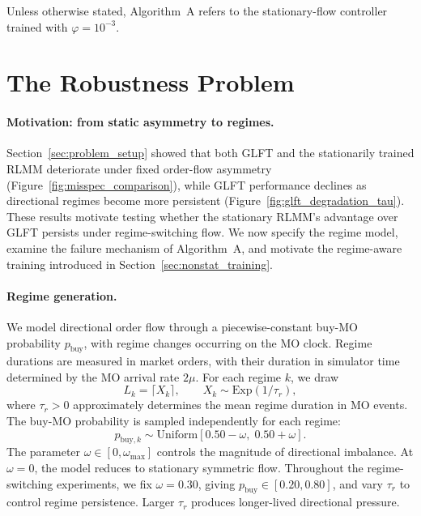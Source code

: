 \documentclass[11pt,a4paper]{article}
\begin{document}
Unless otherwise stated, Algorithm~A refers to the
stationary-flow controller trained with $\varphi=10^{-3}$.

\section{The Robustness Problem}
\label{sec:robustness}


\paragraph{Motivation: from static asymmetry to regimes.}
Section~\ref{sec:problem_setup} showed that both GLFT and the
stationarily trained RLMM deteriorate under fixed order-flow
asymmetry (Figure~\ref{fig:misspec_comparison}), while GLFT
performance declines as directional regimes become more
persistent (Figure~\ref{fig:glft_degradation_tau}).
These results motivate testing whether the stationary RLMM's
advantage over GLFT persists under regime-switching flow.
We now specify the regime model, examine the failure mechanism
of Algorithm~A, and motivate the regime-aware training
introduced in Section~\ref{sec:nonstat_training}.

\paragraph{Regime generation.}
We model directional order flow through a piecewise-constant
buy-MO probability $p_{\mathrm{buy}}$, with regime changes
occurring on the MO clock. Regime durations are measured
in market orders, with their duration in simulator time determined by
the MO arrival rate $2\mu$. For each regime $k$, we draw
\begin{equation}
  L_k=\lceil X_k\rceil,\qquad
  X_k\sim\mathrm{Exp}(1/\tau_r),
\end{equation}
where $\tau_r>0$ approximately determines the mean regime
duration in MO events. The buy-MO probability is sampled
independently for each regime:
\begin{equation}
  p_{\mathrm{buy},k}
  \sim\mathrm{Uniform}[0.50-\omega,\;0.50+\omega].
\end{equation}
The parameter $\omega\in[0,\omega_{\max}]$ controls the
magnitude of directional imbalance. At $\omega=0$, the
model reduces to stationary symmetric flow. Throughout
the regime-switching experiments, we fix $\omega=0.30$,
giving $p_{\mathrm{buy}}\in[0.20,0.80]$, and vary $\tau_r$
to control regime persistence. Larger $\tau_r$ produces
longer-lived directional pressure.
\end{document}
